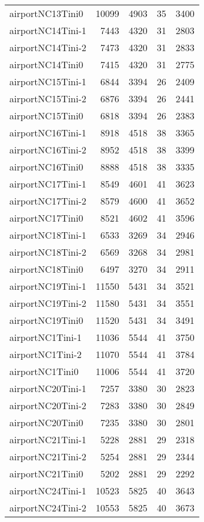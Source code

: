 \begin{longtable}{lrrrr}
airportNC13Tini0 & 10099 & 4903 & 35 & 3400 \\
airportNC14Tini-1 & 7443 & 4320 & 31 & 2803 \\
airportNC14Tini-2 & 7473 & 4320 & 31 & 2833 \\
airportNC14Tini0 & 7415 & 4320 & 31 & 2775 \\
airportNC15Tini-1 & 6844 & 3394 & 26 & 2409 \\
airportNC15Tini-2 & 6876 & 3394 & 26 & 2441 \\
airportNC15Tini0 & 6818 & 3394 & 26 & 2383 \\
airportNC16Tini-1 & 8918 & 4518 & 38 & 3365 \\
airportNC16Tini-2 & 8952 & 4518 & 38 & 3399 \\
airportNC16Tini0 & 8888 & 4518 & 38 & 3335 \\
airportNC17Tini-1 & 8549 & 4601 & 41 & 3623 \\
airportNC17Tini-2 & 8579 & 4600 & 41 & 3652 \\
airportNC17Tini0 & 8521 & 4602 & 41 & 3596 \\
airportNC18Tini-1 & 6533 & 3269 & 34 & 2946 \\
airportNC18Tini-2 & 6569 & 3268 & 34 & 2981 \\
airportNC18Tini0 & 6497 & 3270 & 34 & 2911 \\
airportNC19Tini-1 & 11550 & 5431 & 34 & 3521 \\
airportNC19Tini-2 & 11580 & 5431 & 34 & 3551 \\
airportNC19Tini0 & 11520 & 5431 & 34 & 3491 \\
airportNC1Tini-1 & 11036 & 5544 & 41 & 3750 \\
airportNC1Tini-2 & 11070 & 5544 & 41 & 3784 \\
airportNC1Tini0 & 11006 & 5544 & 41 & 3720 \\
airportNC20Tini-1 & 7257 & 3380 & 30 & 2823 \\
airportNC20Tini-2 & 7283 & 3380 & 30 & 2849 \\
airportNC20Tini0 & 7235 & 3380 & 30 & 2801 \\
airportNC21Tini-1 & 5228 & 2881 & 29 & 2318 \\
airportNC21Tini-2 & 5254 & 2881 & 29 & 2344 \\
airportNC21Tini0 & 5202 & 2881 & 29 & 2292 \\
airportNC24Tini-1 & 10523 & 5825 & 40 & 3643 \\
airportNC24Tini-2 & 10553 & 5825 & 40 & 3673 \\

\end{longtable}

